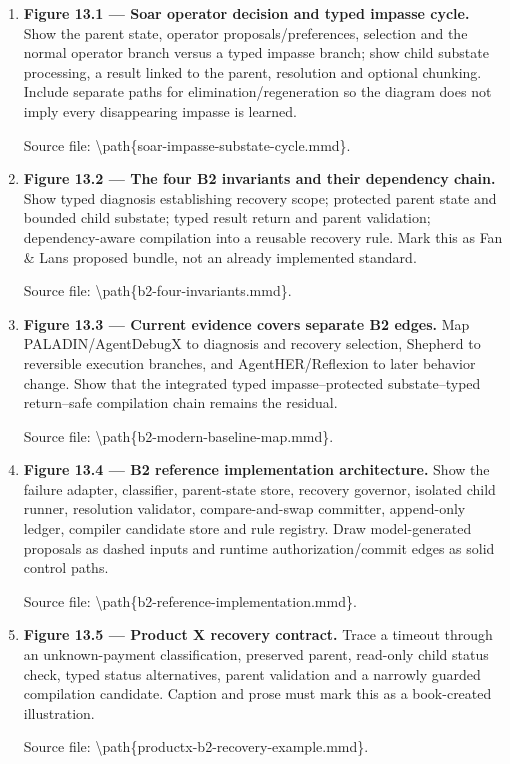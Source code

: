 \begin{enumerate}
\def\labelenumi{\arabic{enumi}.}
\item
  \textbf{Figure 13.1 --- Soar operator decision and typed impasse cycle.} Show the parent state, operator proposals/preferences, selection and the normal operator branch versus a typed impasse branch; show child substate processing, a result linked to the parent, resolution and optional chunking. Include separate paths for elimination/regeneration so the diagram does not imply every disappearing impasse is learned.

  Source file: \textbackslash path\{soar-impasse-substate-cycle.mmd\}.
\item
  \textbf{Figure 13.2 --- The four B2 invariants and their dependency chain.} Show typed diagnosis establishing recovery scope; protected parent state and bounded child substate; typed result return and parent validation; dependency-aware compilation into a reusable recovery rule. Mark this as Fan \& Lan\textquotesingle s proposed bundle, not an already implemented standard.

  Source file: \textbackslash path\{b2-four-invariants.mmd\}.
\item
  \textbf{Figure 13.3 --- Current evidence covers separate B2 edges.} Map PALADIN/AgentDebugX to diagnosis and recovery selection, Shepherd to reversible execution branches, and AgentHER/Reflexion to later behavior change. Show that the integrated typed impasse--protected substate--typed return--safe compilation chain remains the residual.

  Source file: \textbackslash path\{b2-modern-baseline-map.mmd\}.
\item
  \textbf{Figure 13.4 --- B2 reference implementation architecture.} Show the failure adapter, classifier, parent-state store, recovery governor, isolated child runner, resolution validator, compare-and-swap committer, append-only ledger, compiler candidate store and rule registry. Draw model-generated proposals as dashed inputs and runtime authorization/commit edges as solid control paths.

  Source file: \textbackslash path\{b2-reference-implementation.mmd\}.
\item
  \textbf{Figure 13.5 --- Product X recovery contract.} Trace a timeout through an unknown-payment classification, preserved parent, read-only child status check, typed status alternatives, parent validation and a narrowly guarded compilation candidate. Caption and prose must mark this as a book-created illustration.

  Source file: \textbackslash path\{productx-b2-recovery-example.mmd\}.
\end{enumerate}

